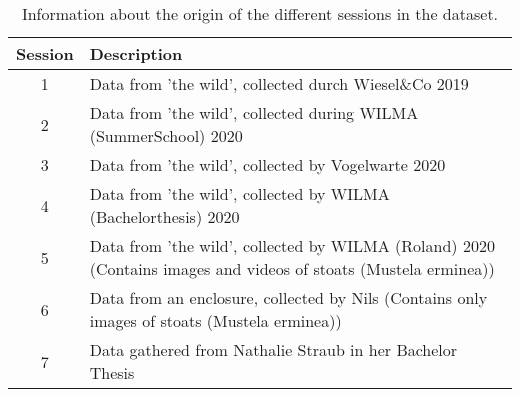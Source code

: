 \begin{table}[H]
\centering
\caption{Information about the origin of the different sessions in the dataset.}
\label{tab:session_info}
\begin{tabular}{c p{12cm}}
\toprule
Session & Description \\
\midrule
1 & Data from 'the wild', collected durch Wiesel\&Co 2019 \\
2 & Data from 'the wild', collected during WILMA (SummerSchool) 2020 \\
3 & Data from 'the wild', collected by Vogelwarte 2020 \\
4 & Data from 'the wild', collected by WILMA (Bachelorthesis) 2020 \\
5 & Data from 'the wild', collected by WILMA (Roland) 2020 (Contains images and videos of stoats (Mustela erminea)) \\
6 & Data from an enclosure, collected by Nils (Contains only images of stoats (Mustela erminea)) \\
7 & Data gathered from Nathalie Straub in her Bachelor Thesis \\
\bottomrule
\end{tabular}
\end{table}